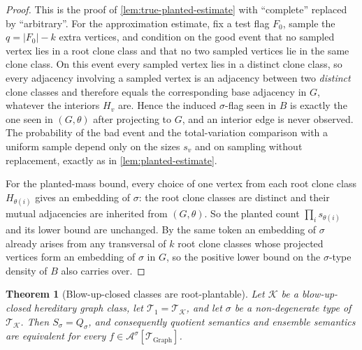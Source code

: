 \documentclass[11pt]{article}
\newtheorem{theorem}{Theorem}
\theoremstyle{definition}
\newcommand{\A}{\mathcal{A}}
\newcommand{\K}{\mathcal{K}}
\newcommand{\T}{\mathcal{T}}
\begin{document}
\begin{proof}
This is the proof of \cref{lem:true-planted-estimate} with ``complete'' replaced by
``arbitrary''.  For the approximation estimate, fix a test flag $F_0$, sample the
$q=|F_0|-k$ extra vertices, and condition on the good event that no sampled vertex lies in
a root clone class and that no two sampled vertices lie in the same clone class.  On
this event every sampled vertex lies in a distinct clone class, so every adjacency
involving a sampled vertex is an adjacency between two \emph{distinct} clone classes and
therefore equals the corresponding base adjacency in $G$, whatever the interiors $H_v$
are.  Hence the induced $\sigma$-flag seen in $B$ is exactly the one seen in $(G,\theta)$
after projecting to $G$, and an interior edge is never observed.  The probability of the
bad event and the total-variation comparison with a uniform sample depend only on the
sizes $s_v$ and on sampling without replacement, exactly as in
\cref{lem:planted-estimate}.

For the planted-mass bound, every choice of one vertex from each root clone class
$H_{\theta(i)}$ gives an embedding of $\sigma$: the root clone classes are distinct
and their mutual adjacencies are inherited from $(G,\theta)$.  So the planted count
$\prod_i s_{\theta(i)}$ and its lower bound are unchanged.  By the same token an
embedding of $\sigma$ already arises from any transversal of $k$ root clone classes
whose projected vertices form an embedding of $\sigma$ in $G$, so the positive lower
bound on the $\sigma$-type density of $B$ also carries over.
\end{proof}

\begin{theorem}[Blow-up-closed classes are root-plantable]\label{thm:blowup-root-plantable}
Let $\K$ be a blow-up-closed hereditary graph class, let $\T_1=\T_\K$, and let $\sigma$
be a non-degenerate type of $\T_\K$.  Then $S_\sigma=Q_\sigma$, and consequently
quotient semantics and ensemble semantics are equivalent for every
$f\in\A^\sigma[\T_{\mathrm{Graph}}]$.
\end{theorem}
\end{document}
